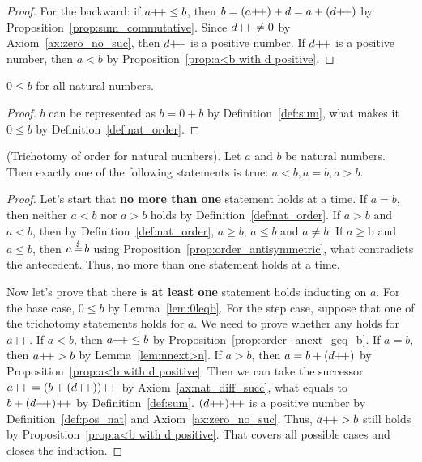 \begin{subsequence}
\begin{proof}
        For the backward: if $a\operatorname{\!+\!+} \leq b$, then $b=(a\operatorname{\!+\!+})+d=a+(d\operatorname{\!+\!+})$ by Proposition~\ref{prop:sum_commutative}. Since $d\operatorname{\!+\!+}\neq 0$ by Axiom~\ref{ax:zero_no_suc}, then $d\operatorname{\!+\!+}$ is a positive number. If $d\operatorname{\!+\!+}$ is a positive number, then $a < b$ by Proposition~\ref{prop:a<b with d positive}. 
    \end{proof}
    \begin{lemma}
        $0 \leq b$ for all natural numbers.\label{lem:0leqb}
    \end{lemma}
    \begin{proof}
        $b$ can be represented as $b=0+b$ by Definition~\ref{def:sum}, what makes it $0\leq b$ by Definition~\ref{def:nat_order}.
    \end{proof}
\end{subsequence}

    
    
\begin{proposition}
    \textup{(Trichotomy of order for natural numbers)}. Let $a$ and $b$ be natural numbers. Then exactly one of the following statements is true: $a<b, a=b, a>b$\label{prop:nat_num_trichotomy}.         
\end{proposition}
\begin{proof}
    Let's start that \textbf{no more than one} statement holds at a time. If $a=b$, then neither $a < b$ nor $a > b$ holds by Definition~\ref{def:nat_order}. If $a>b$ and $a<b$, then by Definition~\ref{def:nat_order}, $a\geq b$, $a \leq b$ and $a\neq b$. If $a \geq $b and $a \leq b$, then $a\operatorname{\stackrel{\lightning}{=}} b$ using Proposition~\ref{prop:order_antisymmetric}, what contradicts the antecedent. Thus, no more than one statement holds at a time. 
    
    Now let's prove that there is \textbf{at least one} statement holds inducting on $a$. For the base case, $0\leq b$ by Lemma~\ref{lem:0leqb}. For the step case, suppose that one of the trichotomy statements holds for $a$. We need to prove whether any holds for $a\operatorname{\!+\!+}$.  If $a<b$, then $a\operatorname{\!+\!+}\leq b$ by Proposition~\ref{prop:order_anext_geq_b}. If $a=b$, then $a\operatorname{\!+\!+} > b$ by Lemma~\ref{lem:nnext>n}.  If $a>b$, then $a=b+(d\operatorname{\!+\!+})$ by Proposition~\ref{prop:a<b with d positive}. Then we can take the successor $a\operatorname{\!+\!+}=(b+(d\operatorname{\!+\!+}))\operatorname{\!+\!+}$ by Axiom~\ref{ax:nat_diff_succ}, what equals to $b+(d\operatorname{\!+\!+})\operatorname{\!+\!+}$ by Definition~\ref{def:sum}. $(d\operatorname{\!+\!+})\operatorname{\!+\!+}$ is a positive number by Definition~\ref{def:pos_nat} and Axiom~\ref{ax:zero_no_suc}. Thus, $a\operatorname{\!+\!+} > b$ still holds by Proposition~\ref{prop:a<b with d positive}. That covers all possible cases and closes the induction.
\end{proof}

